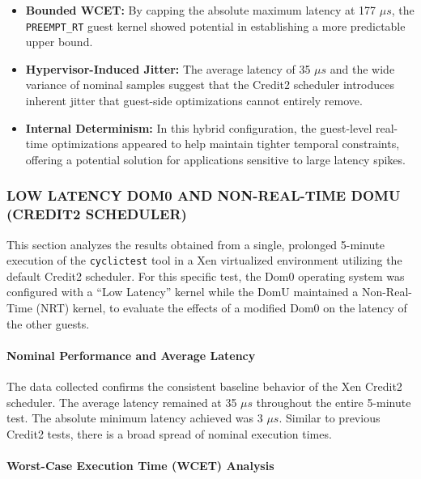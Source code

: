 \begin{itemize}
\item
  \textbf{Bounded WCET:} By capping the absolute maximum latency at 177
  $\mu s$, the \texttt{PREEMPT\_RT} guest kernel showed potential in
  establishing a more predictable upper bound.
\item
  \textbf{Hypervisor-Induced Jitter:} The average latency of 35 $\mu s$ and
  the wide variance of nominal samples suggest that the Credit2
  scheduler introduces inherent jitter that guest-side optimizations
  cannot entirely remove.
\item
  \textbf{Internal Determinism:} In this hybrid configuration, the
  guest-level real-time optimizations appeared to help maintain tighter
  temporal constraints, offering a potential solution for applications
  sensitive to large latency spikes.
\end{itemize}

\subsubsection{LOW LATENCY DOM0 AND NON-REAL-TIME DOMU (CREDIT2
SCHEDULER)}\label{low-latency-dom0-and-non-real-time-domu-credit2-scheduler-1}

This section analyzes the results obtained from a single, prolonged
5-minute execution of the \texttt{cyclictest} tool in a Xen virtualized
environment utilizing the default Credit2 scheduler. For this specific
test, the Dom0 operating system was configured with a ``Low Latency''
kernel while the DomU maintained a Non-Real-Time (NRT) kernel, to
evaluate the effects of a modified Dom0 on the latency of the other
guests.

\paragraph{Nominal Performance and Average
Latency}\label{nominal-performance-and-average-latency-13}

The data collected confirms the consistent baseline behavior of the Xen
Credit2 scheduler. The average latency remained at 35 $\mu s$ throughout the
entire 5-minute test. The absolute minimum latency achieved was 3 $\mu s$.
Similar to previous Credit2 tests, there is a broad spread of nominal
execution times.

\paragraph{Worst-Case Execution Time (WCET)
Analysis}\label{worst-case-execution-time-wcet-analysis-15}


